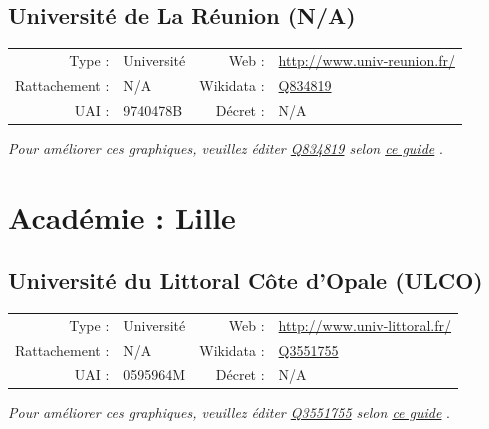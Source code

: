 \documentclass[11pt,french,landscape]{article}
\begin{document}
\hypertarget{universituxe9-de-la-ruxe9union-na}{%
\subsection{Université de La Réunion
(N/A)}\label{universituxe9-de-la-ruxe9union-na}}

\begin{tabular*}{0.45\textwidth}{rp{2cm}rl}  
\hline  
Type : & Université & Web : &\href{http://www.univ-reunion.fr/}{http://www.univ-reunion.fr/} \\  
Rattachement : & N/A & Wikidata : & \href{https://www.wikidata.org/entity/Q834819}{Q834819} \\  
UAI : & 9740478B & Décret : & N/A \\  
\hline  
\end{tabular*}

\textit{\scriptsize Pour améliorer ces graphiques, veuillez éditer \href{https://www.wikidata.org/entity/Q834819}{Q834819}  selon \href{https://github.com/cpesr/wikidataESR/blob/master/Rmd/wikidataESR.md}{ce guide}}
.


\newpage

\hypertarget{acaduxe9mie-lille}{%
\section{Académie : Lille}\label{acaduxe9mie-lille}}

\hypertarget{universituxe9-du-littoral-cuxf4te-dopale-ulco}{%
\subsection{Université du Littoral Côte d'Opale
(ULCO)}\label{universituxe9-du-littoral-cuxf4te-dopale-ulco}}

\begin{tabular*}{0.45\textwidth}{rp{2cm}rl}  
\hline  
Type : & Université & Web : &\href{http://www.univ-littoral.fr/}{http://www.univ-littoral.fr/} \\  
Rattachement : & N/A & Wikidata : & \href{https://www.wikidata.org/entity/Q3551755}{Q3551755} \\  
UAI : & 0595964M & Décret : & N/A \\  
\hline  
\end{tabular*}

\textit{\scriptsize Pour améliorer ces graphiques, veuillez éditer \href{https://www.wikidata.org/entity/Q3551755}{Q3551755}  selon \href{https://github.com/cpesr/wikidataESR/blob/master/Rmd/wikidataESR.md}{ce guide}}
.
\end{document}

